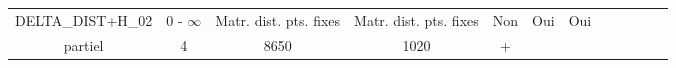 \documentclass{report}
\begin{document}
\begin{landscape}
\begin{tabular}{|c|c|c|c|c|c|c|c|c|c|c|c|}
\begin{minipage}{3.3cm}\vspace{5mm}DELTA\_DIST+H\_02 \vspace{1mm} \end{minipage} &
\begin{minipage}{1.3cm}0 - $\infty$ \end{minipage} &
\begin{minipage}{1.8cm}Matr. dist. pts. fixes \end{minipage} &
\begin{minipage}{1.8cm}Matr. dist. pts. fixes \end{minipage} &
\begin{minipage}{1.4cm}Non \end{minipage} &
\begin{minipage}{1.4cm}Oui \end{minipage} &
\begin{minipage}{2cm} Oui \end{minipage} &
\begin{minipage}{1.8cm}RMSE\\ partiel \end{minipage}&
\begin{minipage}{1.65cm} 4 \end{minipage}&
\begin{minipage}{1.2cm} 8650 \end{minipage} &
\begin{minipage}{1cm}1020 \end{minipage} &
\begin{minipage}{0.9cm}+ \end{minipage} \\  \hline


\end{tabular}
\end{landscape}
\end{document}
